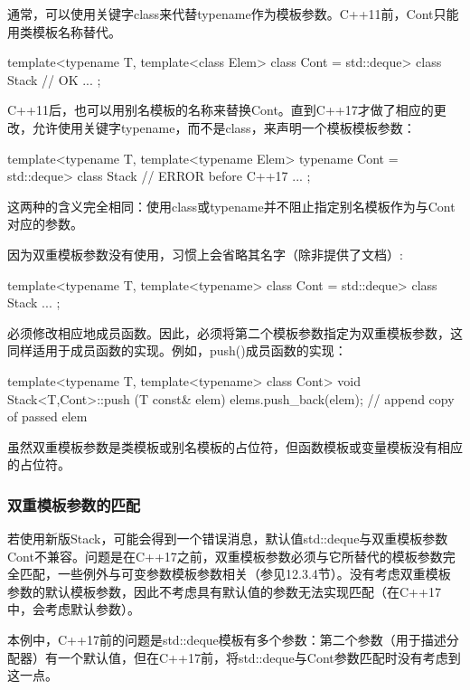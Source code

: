 通常，可以使用关键字class来代替typename作为模板参数。C++11前，Cont只能用类模板名称替代。

\begin{cpp}
template<typename T,
		template<class Elem> class Cont = std::deque>
class Stack { // OK
	...
};
\end{cpp}

C++11后，也可以用别名模板的名称来替换Cont。直到C++17才做了相应的更改，允许使用关键字typename，而不是class，来声明一个模板模板参数：

\begin{cpp}
template<typename T,
		template<typename Elem> typename Cont = std::deque>
class Stack { // ERROR before C++17
	...
};
\end{cpp}

这两种的含义完全相同：使用class或typename并不阻止指定别名模板作为与Cont对应的参数。

因为双重模板参数没有使用，习惯上会省略其名字（除非提供了文档）:

\begin{cpp}
template<typename T,
		template<typename> class Cont = std::deque>
class Stack {
	...
};
\end{cpp}

必须修改相应地成员函数。因此，必须将第二个模板参数指定为双重模板参数，这同样适用于成员函数的实现。例如，push()成员函数的实现：

\begin{cpp}
template<typename T, template<typename> class Cont>
void Stack<T,Cont>::push (T const& elem)
{
	elems.push_back(elem); // append copy of passed elem
}
\end{cpp}

虽然双重模板参数是类模板或别名模板的占位符，但函数模板或变量模板没有相应的占位符。

\subsubsection{双重模板参数的匹配}

若使用新版Stack，可能会得到一个错误消息，默认值std::deque与双重模板参数Cont不兼容。问题是在C++17之前，双重模板参数必须与它所替代的模板参数完全匹配，一些例外与可变参数模板参数相关（参见12.3.4节）。没有考虑双重模板参数的默认模板参数，因此不考虑具有默认值的参数无法实现匹配（在C++17中，会考虑默认参数）。

本例中，C++17前的问题是std::deque模板有多个参数：第二个参数（用于描述分配器）有一个默认值，但在C++17前，将std::deque与Cont参数匹配时没有考虑到这一点。

